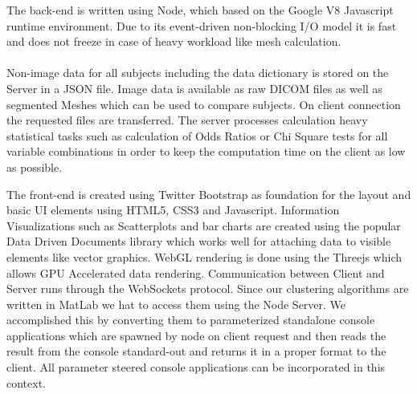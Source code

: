 \documentclass[journal]{style/vgtc} 			          %
\begin{document}
The back-end is written using Node, which based on the Google V8 Javascript runtime environment.
%
Due to its event-driven non-blocking I/O model it is fast and does not freeze in case of heavy workload like mesh calculation.
\\\\
Non-image data for all subjects including the data dictionary is stored on the Server in a JSON file.
%
Image data is available as raw DICOM files as well as segmented Meshes which can be used to compare subjects.
%
On client connection the requested files are transferred.
%
The server processes calculation heavy statistical tasks such as calculation of Odds Ratios or Chi Square tests for all variable combinations in order to keep the computation time on the client as low as possible.
%

The front-end is created using Twitter Bootstrap as foundation for the layout and basic UI elements using HTML5, CSS3 and Javascript.
%
Information Visualizations such as Scatterplots and bar charts are created using the popular Data Driven Documents library which works well for attaching data to visible elements like vector graphics.
%
WebGL rendering is done using the Threejs which allows GPU Accelerated data rendering.
%
Communication between Client and Server runs through the WebSockets protocol.
%
Since our clustering algorithms are written in MatLab we hat to access them using the Node Server.
%
We accomplished this by converting them to parameterized standalone console applications which are spawned by node on client request and then reads the result from the console standard-out and returns it in a proper format to the client.
%
All parameter steered console applications can be incorporated in this context.
\end{document}
